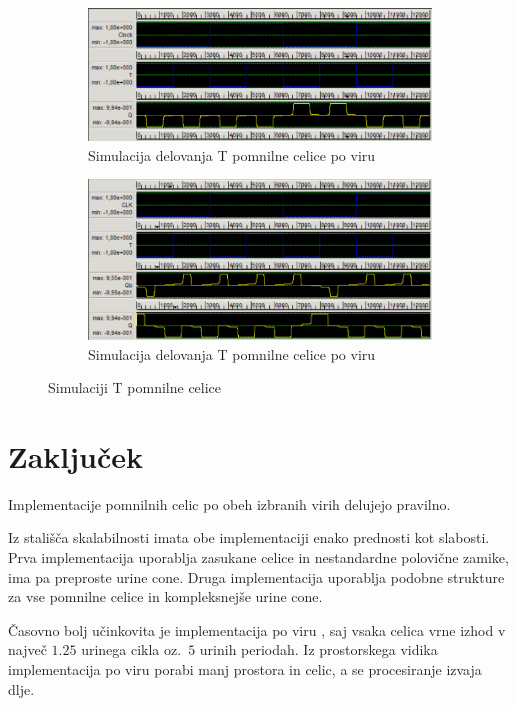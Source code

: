 \documentclass[a4paper, 11pt]{article}
\begin{document}
\begin{figure}[h!]
	\begin{subfigure}[b]{\textwidth}
	\includegraphics[width=\textwidth]{../img/vir_4/sim_t.png}
	\caption{Simulacija delovanja T pomnilne celice po viru \cite{quantum_dot}}
	\label{fig-t-1-sim}
	\end{subfigure}
	\begin{subfigure}[b]{\textwidth}
	\includegraphics[width=\textwidth]{../img/vir_5/sim_t.png}
	\caption{Simulacija delovanja T pomnilne celice po viru \cite{a_novel_approach}}
	\label{fig-t-2-sim}
	\end{subfigure}
	\caption{Simulaciji T pomnilne celice}
	\label{fig-t-sim}
\end{figure}

\section{Zaključek}

Implementacije pomnilnih celic po obeh izbranih virih delujejo pravilno.

Iz stališča skalabilnosti imata obe implementaciji enako prednosti kot slabosti.
Prva implementacija uporablja zasukane celice in nestandardne polovične zamike, ima pa preproste urine cone.
Druga implementacija uporablja podobne strukture za vse pomnilne celice in kompleksnejše urine cone.

Časovno bolj učinkovita je implementacija po viru \cite{quantum_dot}, saj vsaka celica vrne izhod v največ $1.25$ urinega cikla oz.~$5$ urinih periodah. 
Iz prostorskega vidika implementacija po viru \cite{a_novel_approach} porabi manj prostora in celic, a se procesiranje izvaja dlje.


 
\end{document}
